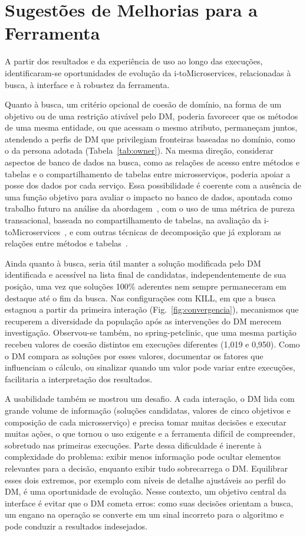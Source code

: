 \documentclass[conference]{IEEEtran}
\newcommand{\itm}{\mbox{i-toMicroservices}}
\begin{document}
\section{Sugestões de Melhorias para a Ferramenta}\label{sec:sugestoes}

A partir dos resultados e da experiência de uso ao longo das execuções, identificaram-se oportunidades de evolução da \itm{}, relacionadas à busca, à interface e à robustez da ferramenta.

Quanto à busca, um critério opcional de coesão de domínio, na forma de um objetivo ou de uma restrição ativável pelo DM, poderia favorecer que os métodos de uma mesma entidade, ou que acessam o mesmo atributo, permaneçam juntos, atendendo a perfis de DM que privilegiam fronteiras baseadas no domínio, como o da persona adotada (Tabela~\ref{tab:owner}). Na mesma direção, considerar aspectos de banco de dados na busca, como as relações de acesso entre métodos e tabelas e o compartilhamento de tabelas entre microsserviços, poderia apoiar a posse dos dados por cada serviço. Essa possibilidade é coerente com a ausência de uma função objetivo para avaliar o impacto no banco de dados, apontada como trabalho futuro na análise da abordagem~\cite{assuncao2022}, com o uso de uma métrica de pureza transacional, baseada no compartilhamento de tabelas, na avaliação da \itm{}~\cite{castanho2026hitl}, e com outras técnicas de decomposição que já exploram as relações entre métodos e tabelas~\cite{wang2024}.

Ainda quanto à busca, seria útil manter a solução modificada pelo DM identificada e acessível na lista final de candidatas, independentemente de sua posição, uma vez que soluções 100\% aderentes nem sempre permaneceram em destaque até o fim da busca. Nas configurações com KILL, em que a busca estagnou a partir da primeira interação (Fig.~\ref{fig:convergencia}), mecanismos que recuperem a diversidade da população após as intervenções do DM merecem investigação. Observou-se também, no spring-petclinic, que uma mesma partição recebeu valores de coesão distintos em execuções diferentes (1,019 e 0,950). Como o DM compara as soluções por esses valores, documentar os fatores que influenciam o cálculo, ou sinalizar quando um valor pode variar entre execuções, facilitaria a interpretação dos resultados.

A usabilidade também se mostrou um desafio. A cada interação, o DM lida com grande volume de informação (soluções candidatas, valores de cinco objetivos e composição de cada microsserviço) e precisa tomar muitas decisões e executar muitas ações, o que tornou o uso exigente e a ferramenta difícil de compreender, sobretudo nas primeiras execuções. Parte dessa dificuldade é inerente à complexidade do problema: exibir menos informação pode ocultar elementos relevantes para a decisão, enquanto exibir tudo sobrecarrega o DM. Equilibrar esses dois extremos, por exemplo com níveis de detalhe ajustáveis ao perfil do DM, é uma oportunidade de evolução. Nesse contexto, um objetivo central da interface é evitar que o DM cometa erros: como suas decisões orientam a busca, um engano na operação se converte em um sinal incorreto para o algoritmo e pode conduzir a resultados indesejados.
\end{document}
